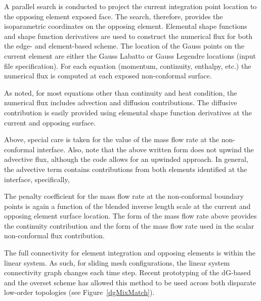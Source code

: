 {A parallel search is conducted to project the current integration point location to the opposing element exposed face. 
The search, therefore, provides the isoparametric coordinates on the opposing element. Elemental shape functions 
and shape function derivatives are used to construct the numerical flux for both the edge- and element-based 
scheme. The location of the Gauss points on the current element are either the Gauss Labatto or Gauss Legendre 
locations (input file specification). For each equation (momentum, continuity, enthalpy, etc.) the numerical 
flux is computed at each exposed non-conformal surface.

As noted, for most equations other than continuity and heat condition, the numerical flux includes advection and 
diffusion contributions. The diffusive contribution is easily provided using elemental shape function derivatives 
at the current and opposing surface. 

Above, special care is taken for the value of the mass flow rate at the non-conformal interface. Also,
note that the above written form does not upwind the advective flux, although the code allows for an upwinded 
approach. In general, the advective term contains contributions from both elements identified at the interface, 
specifically,

The penalty coefficient for the mass flow rate at the non-conformal boundary points is again a function of the 
blended inverse length scale at the current and opposing element surface location. The form of the mass flow 
rate above provides the continuity contribution and the form of the mass flow rate used in the scalar non-conformal
flux contribution.

The full connectivity for element integration and opposing elements is within the linear 
system. As such, for sliding mesh configurations, the linear system connectivity graph changes each time step. Recent prototyping of 
the dG-based and the overset scheme has allowed this method to be used across both disparate low-order 
topologies (see Figure~\ref{dgMixMatch}).

}
